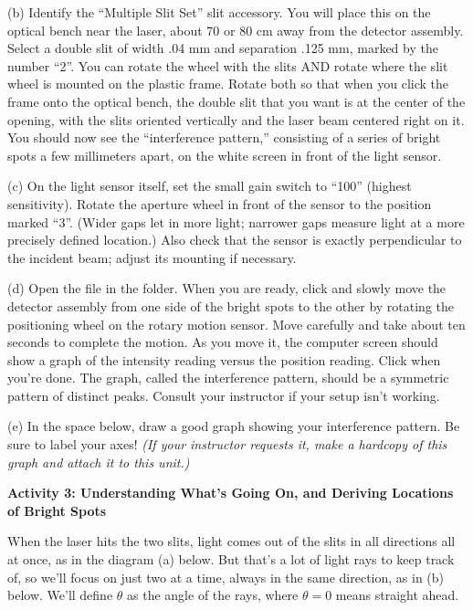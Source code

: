 (b) Identify the ``Multiple Slit Set'' slit accessory.  You will place this on the optical bench near the laser, about 70 or 80 cm away from the detector assembly.  Select a double slit of width .04 mm and separation .125 mm, marked by the number ``2''. You can rotate the wheel with the slits AND rotate where the slit wheel is mounted on the plastic frame.  
Rotate both so that when you click the frame onto the optical bench, the double slit that you want is at the center of the opening, with the slits oriented vertically and the laser beam centered right on it.  You should now see the ``interference pattern,'' consisting of a series of bright spots a few millimeters apart, on the white screen in front of the light sensor.


(c) On the light sensor itself, set the small gain switch to ``100'' (highest sensitivity).  Rotate the aperture wheel in front of the sensor to the position marked ``3''.  (Wider gaps let in more light; narrower gaps measure light at a more precisely defined location.)  Also check that the sensor is exactly perpendicular to the incident beam; adjust its mounting if necessary.


(d) Open the file  in the \filename{\coursefolder} folder. 
When you are ready, click  and slowly move the detector assembly 
from one side of the bright spots to the other by rotating the positioning wheel on the rotary 
motion sensor. Move carefully and take about ten seconds to complete the 
motion. 
As you move it, the computer screen should show a graph of the intensity reading versus the position reading. 
Click  when you're done. 
The graph, called the interference pattern, should be a symmetric pattern of distinct peaks. Consult your instructor if your setup isn't working.

(e) In the space below, draw a good graph showing your interference pattern.  
Be sure to label your axes!
\textit{(If your instructor requests it, make a hardcopy of this graph and attach it to this unit.)}

\answerspace{1.0in}


\pagebreak[2]
\textbf{Activity 3: Understanding What's Going On, and Deriving Locations of Bright Spots}

When the laser hits the two slits, 
light comes out of the slits in all directions all at once, as in the diagram (a) below.  
But that's a lot of light rays to keep track of, so we'll focus on just two at a time, always in the same direction, as in (b) below.
We'll define $\theta$ as the angle of the rays, where $\theta=0$ means straight ahead.  

